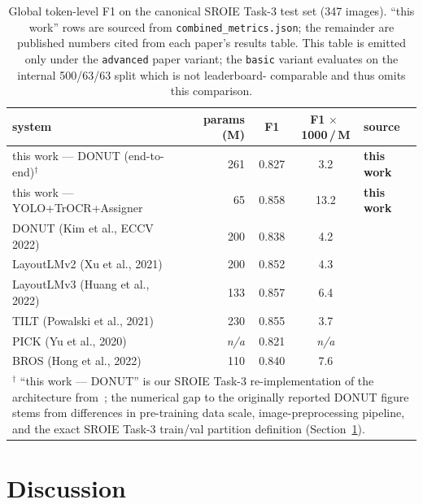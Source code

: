 \documentclass[conference]{IEEEtran}
\begin{document}
\begin{table}[t]
  \centering
  \caption{Global token-level F1 on the canonical SROIE Task-3 test
           set (347 images).  ``this work'' rows are sourced from
           \texttt{combined\_metrics.json}; the remainder are
           published numbers cited from each paper's results table.
           This table is emitted only under the \texttt{advanced}
           paper variant; the \texttt{basic} variant evaluates on
           the internal 500/63/63 split which is not leaderboard-
           comparable and thus omits this comparison.}
  \label{tab:competitors}
  \begin{tabular}{lrccl}
\toprule
system & params (M) & F1 & F1$\,\times\,$1000\,/\,M & source \\
\midrule
this work — DONUT (end-to-end)$^{\dagger}$ & 261 & 0.827 & 3.2 & \textbf{this work} \\
this work — YOLO+TrOCR+Assigner & 65 & 0.858 & 13.2 & \textbf{this work} \\
DONUT (Kim et al., ECCV 2022) & 200 & 0.838 & 4.2 & \cite{kim2022donut} \\
LayoutLMv2 (Xu et al., 2021) & 200 & 0.852 & 4.3 & \cite{xu2021layoutlmv2} \\
LayoutLMv3 (Huang et al., 2022) & 133 & 0.857 & 6.4 & \cite{huang2022layoutlmv3} \\
TILT (Powalski et al., 2021) & 230 & 0.855 & 3.7 & \cite{powalski2021tilt} \\
PICK (Yu et al., 2020) & \textit{n/a} & 0.821 & \textit{n/a} & \cite{yu2020pick} \\
BROS (Hong et al., 2022) & 110 & 0.840 & 7.6 & \cite{hong2022bros} \\
\midrule
\multicolumn{5}{p{0.92\linewidth}}{\footnotesize $^{\dagger}$ ``this work --- DONUT'' is our SROIE Task-3 re-implementation of the architecture from~\cite{kim2022donut}; the numerical gap to the originally reported DONUT figure stems from differences in pre-training data scale, image-preprocessing pipeline, and the exact SROIE Task-3 train/val partition definition (Section~\ref{sec:discussion}).} \\
\bottomrule
\end{tabular}
\end{table}

\section{Discussion}
\label{sec:discussion}
\end{document}
